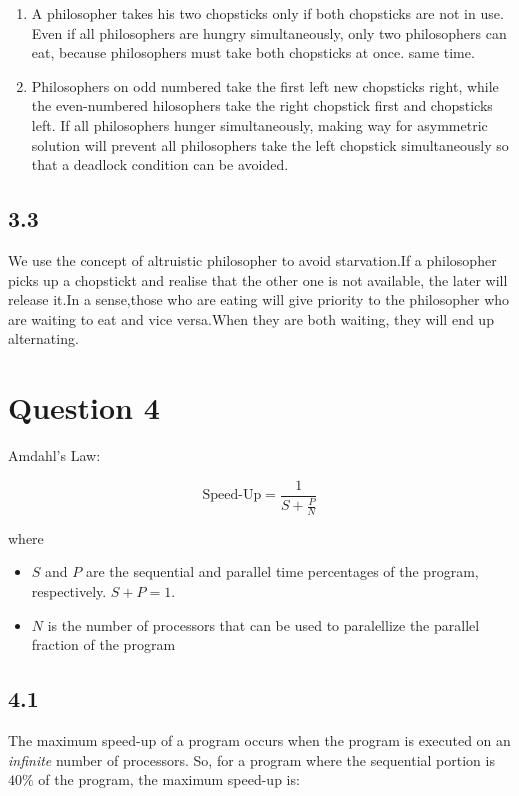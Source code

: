 \documentclass[11pt, letterpaper]{article}
\begin{document}
\begin{enumerate}
	\item A philosopher takes his two chopsticks only if both chopsticks are not in use. Even if all philosophers are hungry simultaneously, only two philosophers can eat, because philosophers must take both chopsticks at once.
same time.
	\item Philosophers on odd numbered take the first left new chopsticks right, while the even-numbered hilosophers take the right chopstick first and chopsticks left. If all philosophers hunger simultaneously, making way for asymmetric solution will prevent all philosophers take the left chopstick simultaneously so that a deadlock condition can be avoided.
\end{enumerate}

\subsection*{3.3}
We use the concept of altruistic philosopher to avoid starvation.If a philosopher picks up a chopstickt and realise that the other one is not available, the later will release it.In a sense,those who are eating will give priority to the philosopher who are waiting to eat and vice versa.When they are both waiting, they will end up alternating.

\pagebreak

\section*{Question 4}

Amdahl's Law:

$$
\text{Speed-Up} = \frac{1}{S + \frac{P}{N}}
$$

where

\begin{itemize}
    \item $S$ and $P$ are the sequential and parallel time percentages of the program, respectively. $S + P = 1$.
    \item $N$ is the number of processors that can be used to paralellize the parallel fraction of the program
\end{itemize}

\subsection*{4.1}

The maximum speed-up of a program occurs when the program is executed on an \textit{infinite} number of processors. So, for a program where the sequential portion is $40\%$ of the program, the maximum speed-up is:
\end{document}
